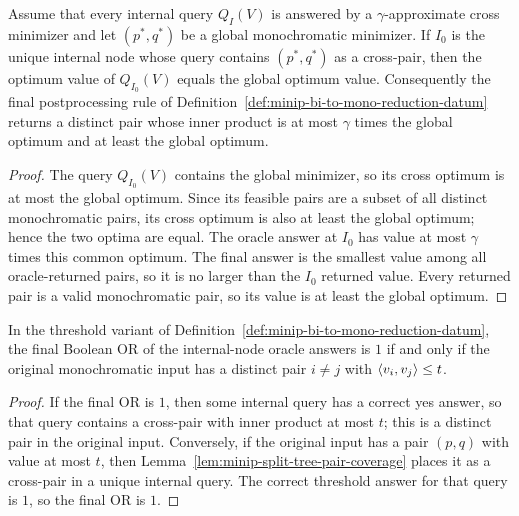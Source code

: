 \begin{lemma}
  \label{lem:minip-recursive-approx-answer-combination}
  Assume that every internal query $Q_I(V)$ is answered by a
  $\gamma$-approximate cross minimizer and let $(p^*,q^*)$ be a global
  monochromatic minimizer.  If $I_0$ is the unique internal node whose query
  contains $(p^*,q^*)$ as a cross-pair, then the optimum value of $Q_{I_0}(V)$
  equals the global optimum value.  Consequently the final postprocessing rule
  of Definition~\ref{def:minip-bi-to-mono-reduction-datum} returns a distinct
  pair whose inner product is at most $\gamma$ times the global optimum and at
  least the global optimum.
\end{lemma}
\begin{proof}
  The query $Q_{I_0}(V)$ contains the global minimizer, so its cross optimum is
  at most the global optimum.  Since its feasible pairs are a subset of all
  distinct monochromatic pairs, its cross optimum is also at least the global
  optimum; hence the two optima are equal.  The oracle answer at $I_0$ has
  value at most $\gamma$ times this common optimum.  The final answer is the
  smallest value among all oracle-returned pairs, so it is no larger than the
  $I_0$ returned value.  Every returned pair is a valid monochromatic pair, so
  its value is at least the global optimum.
\end{proof}

\begin{lemma}
  \label{lem:minip-recursive-threshold-answer-combination}
  In the threshold variant of
  Definition~\ref{def:minip-bi-to-mono-reduction-datum}, the final Boolean OR
  of the internal-node oracle answers is $1$ if and only if the original
  monochromatic input has a distinct pair $i\neq j$ with
  $\left\langle v_i,v_j\right\rangle\leq t$.
\end{lemma}
\begin{proof}
  If the final OR is $1$, then some internal query has a correct yes answer,
  so that query contains a cross-pair with inner product at most $t$; this is a
  distinct pair in the original input.  Conversely, if the original input has a
  pair $(p,q)$ with value at most $t$, then
  Lemma~\ref{lem:minip-split-tree-pair-coverage} places it as a cross-pair in
  a unique internal query.  The correct threshold answer for that query is
  $1$, so the final OR is $1$.
\end{proof}

